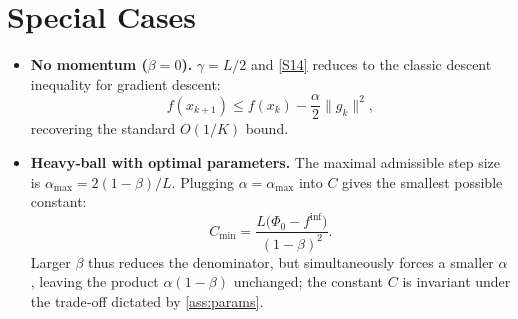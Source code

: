 \documentclass{article}
\begin{document}
\section*{Special Cases}
\begin{itemize}
\item \textbf{No momentum ($\beta=0$).}  $\gamma=L/2$ and \eqref{S14} reduces to the classic descent inequality for gradient descent:
\[
f(x_{k+1})\le f(x_{k})-\frac{\alpha}{2}\|g_{k}\|^{2},
\]
recovering the standard $O(1/K)$ bound.
\item \textbf{Heavy‑ball with optimal parameters.}  The maximal admissible step size is $\alpha_{\max}=2(1-\beta)/L$. Plugging $\alpha=\alpha_{\max}$ into $C$ gives the smallest possible constant:
\[
C_{\min}= \frac{L\bigl(\Phi_{0}-f^{\inf}\bigr)}{(1-\beta)^{2}}.
\]
Larger $\beta$ thus reduces the denominator, but simultaneously forces a smaller $\alpha$, leaving the product $\alpha(1-\beta)$ unchanged; the constant $C$ is invariant under the trade‑off dictated by \eqref{ass:params}.
\end{itemize}
\end{document}
